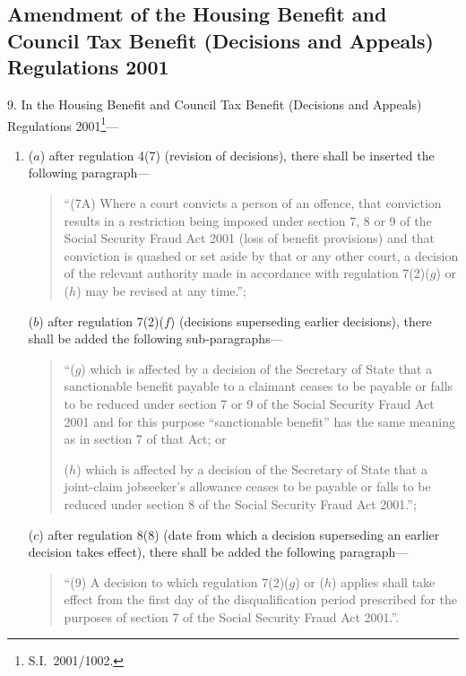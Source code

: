 \documentclass[12pt,a4paper]{article}
\begin{document}
\subsection[9. Amendment of the Housing Benefit and Council Tax Benefit (Decisions and Appeals) Regulations 2001]{Amendment of the Housing Benefit and Council Tax Benefit (Decisions and Appeals) Regulations 2001}

9.  In the Housing Benefit and Council Tax Benefit (Decisions and Appeals) Regulations 2001\footnote{S.I.\ 2001/1002.}—
\begin{enumerate}\item[]
($a$) after regulation 4(7) (revision of decisions), there shall be inserted the following paragraph—
\begin{quotation}
“(7A) Where a court convicts a person of an offence, that conviction results in a restriction being imposed under section 7, 8 or 9 of the Social Security Fraud Act 2001 (loss of benefit provisions) and that conviction is quashed or set aside by that or any other court, a decision of the relevant authority made in accordance with regulation 7(2)($g$)  or ($h$)  may be revised at any time.”;
\end{quotation}

($b$) after regulation 7(2)($f$)  (decisions superseding earlier decisions), there shall be added the following sub-paragraphs—
\begin{quotation}
“($g$) which is affected by a decision of the Secretary of State that a sanctionable benefit payable to a claimant ceases to be payable or falls to be reduced under section 7 or 9 of the Social Security Fraud Act 2001 and for this purpose “sanctionable benefit” has the same meaning as in section 7 of that Act; or

($h$) which is affected by a decision of the Secretary of State that a joint-claim jobseeker’s allowance ceases to be payable or falls to be reduced under section 8 of the Social Security Fraud Act 2001.”;
\end{quotation}

($c$) after regulation 8(8) (date from which a decision superseding an earlier decision takes effect), there shall be added the following paragraph—
\begin{quotation}
“(9) A decision to which regulation 7(2)($g$)  or ($h$)  applies shall take effect from the first day of the disqualification period prescribed for the purposes of section 7 of the Social Security Fraud Act 2001.”.
\end{quotation}
\end{enumerate}
\end{document}
